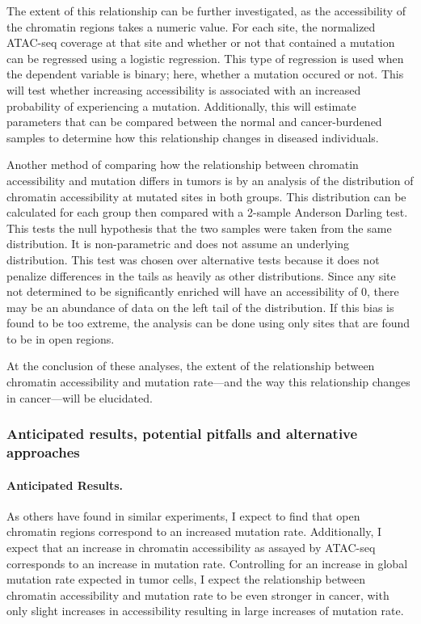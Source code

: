 The extent of this relationship can be further investigated, as the accessibility of the chromatin regions takes a numeric value. For each site, the normalized ATAC-seq coverage at that site and whether or not that contained a mutation can be regressed using a logistic regression. This type of regression is used when the dependent variable is binary; here, whether a mutation occured or not. This will test whether increasing accessibility is associated with an increased probability of experiencing a mutation. Additionally, this will estimate parameters that can be compared between the normal and cancer-burdened samples to determine how this relationship changes in diseased individuals.

Another method of comparing how the relationship between chromatin accessibility and mutation differs in tumors is by an analysis of the distribution of chromatin accessibility at mutated sites in both groups. This distribution can be calculated for each group then compared with a 2-sample Anderson Darling test. This tests the null hypothesis that the two samples were taken from the same distribution. It is non-parametric and does not assume an underlying distribution. This test was chosen over alternative tests because it does not penalize differences in the tails as heavily as other distributions. Since any site not determined to be significantly enriched will have an accessibility of 0, there may be an abundance of data on the left tail of the distribution. If this bias is found to be too extreme, the analysis can be done using only sites that are found to be in open regions.

At the conclusion of these analyses, the extent of the relationship between chromatin accessibility and mutation rate---and the way this relationship changes in cancer---will be elucidated.

\subsubsection{Anticipated results, potential pitfalls and alternative approaches}
\paragraph{Anticipated Results.}
As others have found in similar experiments, I expect to find that open chromatin regions correspond to an increased mutation rate. Additionally, I expect that an increase in chromatin accessibility as assayed by ATAC-seq corresponds to an increase in mutation rate. Controlling for an increase in global mutation rate expected in tumor cells, I expect the relationship between chromatin accessibility and mutation rate to be even stronger in cancer, with only slight increases in accessibility resulting in large increases of mutation rate.

